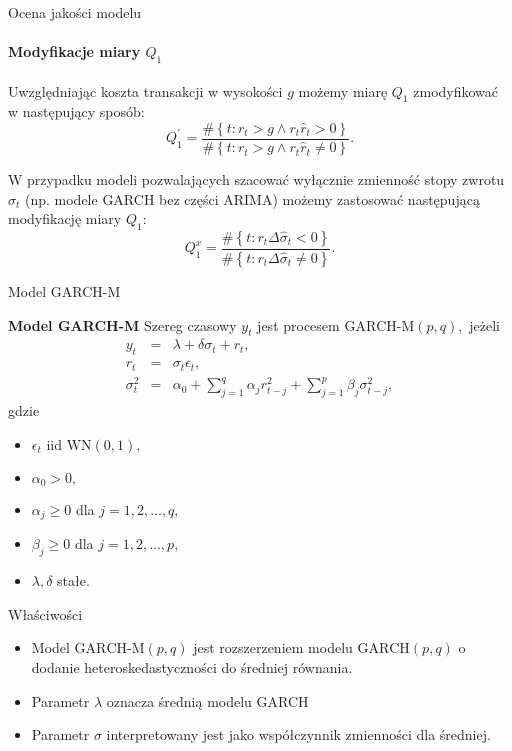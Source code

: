 \documentclass[a4paper, 11pt]{beamer}
\begin{document}
	\begin{frame}{Ocena jakości modelu}
		\framesubtitle{Modyfikacje miary $Q_1$}
		
		Uwzględniając koszta transakcji w wysokości $g$ możemy miarę $Q_1$
		zmodyfikować w następujący sposób:\[
			Q_1^{\prime} = \frac{
				\#\left\{t: r_t > g \wedge r_t \hat{r}_t > 0\right\}
			}{
				\#\left\{t: r_t > g \wedge r_t \hat{r}_t \neq 0\right\}
			}.
		\]
		
		W przypadku modeli pozwalających szacować wyłącznie zmienność stopy zwrotu
		$\sigma_t$ (np. modele GARCH bez części ARIMA) możemy zastosować następującą
		modyfikację miary $Q_1:$ \[
			Q_1^{x} = \frac{
				\#\left\{t: r_t \Delta \hat{\sigma}_t < 0\right\}
			}{
				\#\left\{t: r_t \Delta \hat{\sigma}_t \neq 0\right\}
			}.
		\]
		
		
	\end{frame}
	
	\begin{frame}{Model GARCH-M}
		\begin{block}{\textbf{Model GARCH-M}}
			Szereg czasowy $y_t$ jest procesem $\mbox{GARCH-M}\left(p,q\right),$ jeżeli \begin{eqnarray*}
				y_t & = & \lambda + \delta \sigma_t + r_t,\\
				r_t & = & \sigma_t \epsilon_t,\\
				\sigma^2_t & = & \alpha_0 + \sum_{j=1}^{q} \alpha_j r_{t-j}^2 + \sum_{j=1}^{p} \beta_j \sigma_{t-j}^2,
			\end{eqnarray*} gdzie
			\begin{itemize}
				\item $\epsilon_t \mbox{ iid } \mbox{WN}\left(0, 1\right),$
				\item $\alpha_0 > 0,$
				\item $\alpha_j \geq 0$ dla $j=1,2,\ldots,q,$
				\item $\beta_j \geq 0$ dla $j=1,2,\ldots,p,$
				\item $\lambda, \delta$ stałe.
			\end{itemize}
		\end{block}
	\end{frame}
	
	\begin{frame}{Właściwości}
		\begin{itemize}
			\item Model $\mbox{GARCH-M}\left(p,q\right)$ jest rozszerzeniem modelu $\mbox{GARCH}\left(p,q\right)$ o dodanie heteroskedastyczności do średniej równania.
			\item Parametr $\lambda$ oznacza średnią modelu GARCH
			\item Parametr $\sigma$ interpretowany jest jako współczynnik zmienności dla średniej.
		\end{itemize}
	\end{frame}
	
\end{document}
